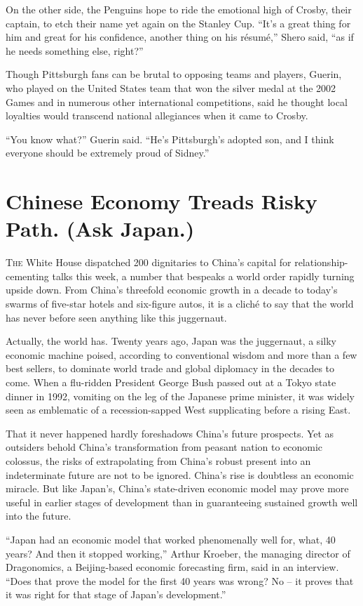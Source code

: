 ﻿\documentclass[12pt]{article}
\begin{document}
On the other side, the Penguins hope to ride the emotional high of Crosby, their captain, to etch
their name yet again on the Stanley Cup. ``It's a great thing for him and great for his confidence,
another thing on his r\'esum\'e,'' Shero said, ``as if he needs something else, right?''

Though Pittsburgh fans can be brutal to opposing teams and players, Guerin, who played on the United
States team that won the silver medal at the 2002 Games and in numerous other international
competitions, said he thought local loyalties would transcend national allegiances when it came to
Crosby.

``You know what?'' Guerin said. ``He's Pittsburgh's adopted son, and I think everyone should be
extremely proud of Sidney.''

\section{Chinese Economy Treads Risky Path. (Ask Japan.)}

\lettrine{T}{he} White House dispatched 200 dignitaries to China's capital
for relationship-cementing talks this week, a number that bespeaks a world order rapidly turning
upside down. From China's threefold economic growth in a decade to today's swarms of five-star
hotels and six-figure autos, it is a clich\'e to say that the world has never before seen anything
like this juggernaut.

Actually, the world has. Twenty years ago, Japan was the juggernaut, a silky economic machine
poised, according to conventional wisdom and more than a few best sellers, to dominate world trade
and global diplomacy in the decades to come. When a flu-ridden President George Bush passed out at a
Tokyo state dinner in 1992, vomiting on the leg of the Japanese prime minister, it was widely seen
as emblematic of a recession-sapped West supplicating before a rising East.

That it never happened hardly foreshadows China's future prospects. Yet as outsiders behold China's
transformation from peasant nation to economic colossus, the risks of extrapolating from China's
robust present into an indeterminate future are not to be ignored. China's rise is doubtless an
economic miracle. But like Japan's, China's state-driven economic model may prove more useful in
earlier stages of development than in guaranteeing sustained growth well into the future.

``Japan had an economic model that worked phenomenally well for, what, 40 years? And then it stopped
working,'' Arthur Kroeber, the managing director of Dragonomics, a Beijing-based economic
forecasting firm, said in an interview. ``Does that prove the model for the first 40 years was
wrong? No -- it proves that it was right for that stage of Japan's development.''
\end{document}
